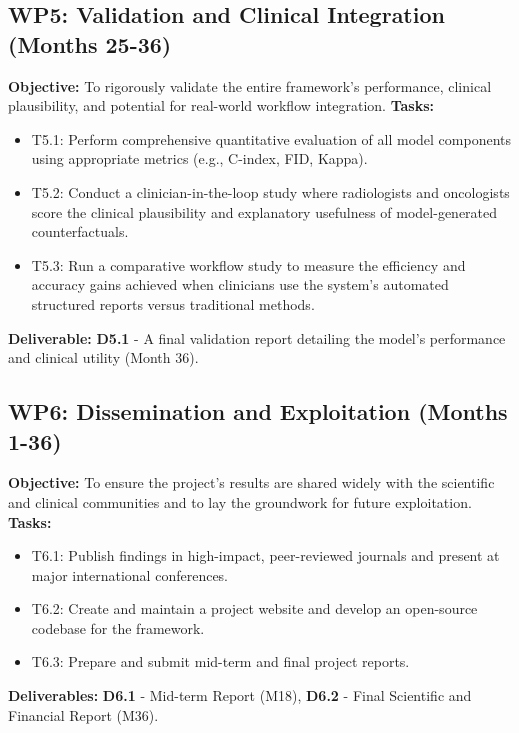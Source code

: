 \documentclass[11pt, a4paper]{article}
\begin{document}
\subsection*{WP5: Validation and Clinical Integration (Months 25-36)}
\textbf{Objective:} To rigorously validate the entire framework's performance, clinical plausibility, and potential for real-world workflow integration.
\textbf{Tasks:}
\begin{itemize}
    \item T5.1: Perform comprehensive quantitative evaluation of all model components using appropriate metrics (e.g., C-index, FID, Kappa).
    \item T5.2: Conduct a clinician-in-the-loop study where radiologists and oncologists score the clinical plausibility and explanatory usefulness of model-generated counterfactuals.
    \item T5.3: Run a comparative workflow study to measure the efficiency and accuracy gains achieved when clinicians use the system's automated structured reports versus traditional methods.
\end{itemize}
\textbf{Deliverable:} \textbf{D5.1} - A final validation report detailing the model's performance and clinical utility (Month 36).

\subsection*{WP6: Dissemination and Exploitation (Months 1-36)}
\textbf{Objective:} To ensure the project's results are shared widely with the scientific and clinical communities and to lay the groundwork for future exploitation.
\textbf{Tasks:}
\begin{itemize}
    \item T6.1: Publish findings in high-impact, peer-reviewed journals and present at major international conferences.
    \item T6.2: Create and maintain a project website and develop an open-source codebase for the framework.
    \item T6.3: Prepare and submit mid-term and final project reports.
\end{itemize}
\textbf{Deliverables:} \textbf{D6.1} - Mid-term Report (M18), \textbf{D6.2} - Final Scientific and Financial Report (M36).
\end{document}
